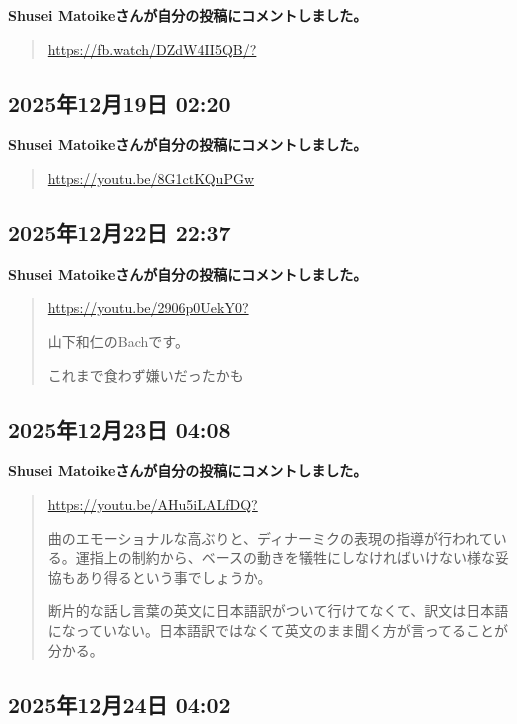 \textbf{Shusei Matoikeさんが自分の投稿にコメントしました。}

\begin{quote}
\url{https://fb.watch/DZdW4II5QB/?}
\end{quote}

\subsection*{2025年12月19日 02:20}

\textbf{Shusei Matoikeさんが自分の投稿にコメントしました。}

\begin{quote}
\url{https://youtu.be/8G1ctKQuPGw}
\end{quote}

\subsection*{2025年12月22日 22:37}

\textbf{Shusei Matoikeさんが自分の投稿にコメントしました。}

\begin{quote}
\url{https://youtu.be/2906p0UekY0?}

山下和仁のBachです。

これまで食わず嫌いだったかも
\end{quote}

\subsection*{2025年12月23日 04:08}

\textbf{Shusei Matoikeさんが自分の投稿にコメントしました。}

\begin{quote}
\url{https://youtu.be/AHu5iLALfDQ?}

曲のエモーショナルな高ぶりと、ディナーミクの表現の指導が行われている。運指上の制約から、ベースの動きを犠牲にしなければいけない様な妥協もあり得るという事でしょうか。

断片的な話し言葉の英文に日本語訳がついて行けてなくて、訳文は日本語になっていない。日本語訳ではなくて英文のまま聞く方が言ってることが分かる。
\end{quote}

\subsection*{2025年12月24日 04:02}

